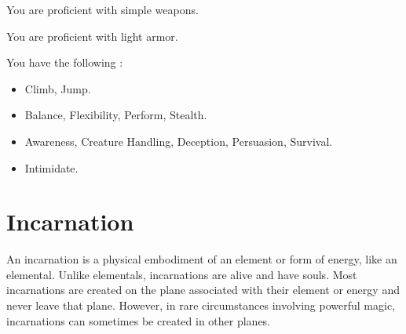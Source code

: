         You are proficient with simple weapons.

        You are proficient with light armor.

        You have the following :
        \begin{itemize}
            \item {} Climb, Jump.
            \item {} Balance, Flexibility, Perform, Stealth.
            \item {} Awareness, Creature Handling, Deception, Persuasion, Survival.
            \item {} Intimidate.
        \end{itemize}

\section{Incarnation}

    An incarnation is a physical embodiment of an element or form of energy, like an elemental.
    Unlike elementals, incarnations are alive and have souls.
    Most incarnations are created on the plane associated with their element or energy and never leave that plane.
    However, in rare circumstances involving powerful magic, incarnations can sometimes be created in other planes.

